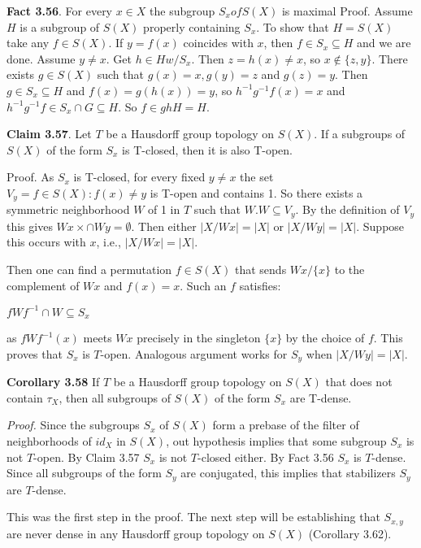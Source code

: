 \documentclass[12pt]{article}
\begin{document}
    \textbf{Fact 3.56}. For every $x \in X$ the subgroup $S_x of S(X)$ is maximal
        Proof. Assume $H$ is a subgroup of $S(X)$ properly containing $S_x$. To show that $H = S(X)$ take any $f \in S(X)$.
    If $y = f(x)$ coincides with $x$, then $f \in S_x \subseteq H$ and we are done. Assume $y \neq x$. Get $h \in H w/ S_x$. Then
    $z = h(x) \neq x$, so $x \notin \{z, y\}$. There exists $g \in S(X)$ such that $g(x) = x, g(y) = z$ and $g(z) = y$. Then
    $g \in S_x \subseteq H$ and $f(x) = g(h(x)) = y$, so $h^{-1} g^{-1}f(x) = x$ and $h^{-1} g^{-1}f \in S_x \cap G \subseteq H$. So $f \in ghH = H$.


    \textbf{Claim 3.57}. Let $T$ be a Hausdorff group topology on $S(X)$. If a subgroups of $S(X)$ of the form $S_x$ is T-closed,
    then it is also T-open.


        Proof. As $S_x$ is T-closed, for every fixed $y \neq x$ the set $V_y = {f \in S(X) : f(x) \neq y}$ is T-open and contains 1.
    So there exists a symmetric neighborhood $W$ of 1 in $T$ such that $W.W \subseteq V_y$. By the definition of $V_y$ this gives
    $W x \times \cap W y = \emptyset$. Then either $|X / Wx| = |X|$ or $|X / W y| = |X|$. Suppose this occurs with $x$, i.e., $|X / W x| = |X|$.


        Then one can find a permutation $f \in S(X)$ that sends $W x / \{x\}$ to the complement of $W x$ and $f(x) = x$. Such
    an $f$ satisfies:


        $fW f^{-1} \cap W \subseteq S_x$


        as $fW f^{-1}(x)$ meets $W x$ precisely in the singleton $\{x\}$ by the choice of $f$. This proves that $S_x$ is $T$-open.
    Analogous argument works for $S_y$ when $|X/W y| = |X|$.


    \textbf{Corollary 3.58} If $T$ be a Hausdorff group topology on $S(X)$ that does not contain $\tau_X$, then all subgroups of
    $S(X)$ of the form $S_x$ are T-dense.


        \emph{Proof.} Since the subgroups $S_x$ of $S(X)$ form a prebase of the filter of neighborhoods of $id_X$ in $S(X)$, out
    hypothesis implies that some subgroup $S_x$ is not $T$-open. By Claim 3.57 $S_x$ is not $T$-closed either. By Fact
    3.56 $S_x$ is $T$-dense. Since all subgroups of the form $S_y$ are conjugated, this implies that stabilizers $S_y$ are
    $T$-dense.


        This was the first step in the proof. The next step will be establishing that $S_{x,y}$ are never dense in any
    Hausdorff group topology on $S(X)$ (Corollary 3.62).
\end{document}
